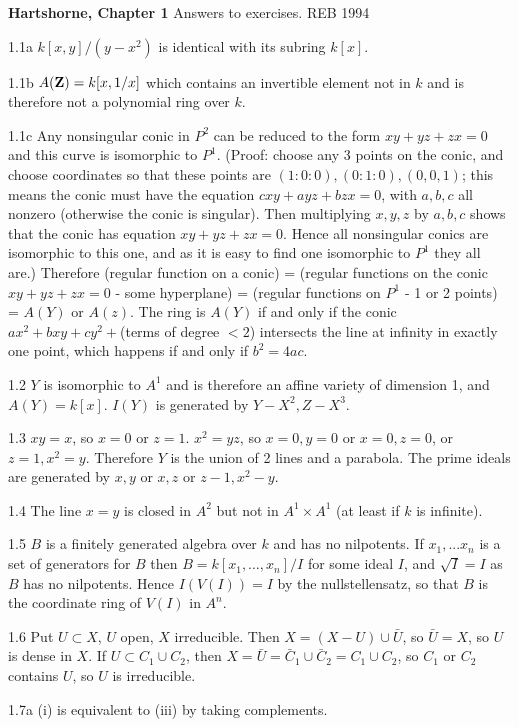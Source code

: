 \def\Z{{\bf Z}}
{\bf Hartshorne, Chapter 1}
Answers to exercises. \hfill REB 1994
\item{1.1a} $k[x,y]/(y-x^2)$ is identical with its subring $k[x]$. 
\item{1.1b} $A(\Z)=k[x,1/x]$ which contains an invertible element not
in $k$ and is therefore not a polynomial ring over $k$. 
\item{1.1c} Any nonsingular 
conic in $P^2$ can be reduced to the form $xy+yz+zx=0$
and this curve is isomorphic to $P^1$. (Proof: choose any 3 points
on the conic, and choose coordinates so that these points 
are $(1:0:0), (0:1:0), (0,0,1)$; this means the conic must
have the equation $cxy+ayz+bzx=0$, with $a,b,c$ all nonzero
(otherwise the conic is singular). Then multiplying
$x,y,z$ by $a,b,c$ shows that the conic has equation $xy+yz+zx=0$.
Hence all nonsingular conics are isomorphic to this one, 
and as it is easy to find one isomorphic to $P^1$ they all are.) 
Therefore (regular function on a conic) = (regular functions
on the conic $xy+yz+zx=0$ - some hyperplane) = 
(regular functions on $P^1$ - 1 or 2 points) = $A(Y)$ or $A(z)$. 
The ring is $A(Y)$ if and only if the conic $ax^2+bxy+cy^2+$(terms of degree
$< 2$)
intersects the line at infinity
in exactly one point, which happens if and only if $b^2=4ac$.  
\item{1.2} $Y$ is isomorphic to $A^1$ and is therefore an affine variety of
dimension 1, and $A(Y)=k[x]$. $I(Y) $ is generated by $Y-X^2,Z-X^3$. 
\item{1.3} $xy=x$, so $x=0$ or $z=1$. $x^2=yz$, so $x=0,y=0$ or
$x=0,z=0$, or $z=1,x^2=y$. Therefore $Y$ is the union of 2 lines
and a parabola. The prime ideals are generated by $x,y$ or $x,z$
or $z-1,x^2-y$. 
\item {1.4} The line $x=y$ is closed in $A^2$ but not in $A^1\times A^1$
(at least if $k$ is infinite).
\item{1.5} $B$ is a finitely generated algebra over $k$ and has no nilpotents.
If $x_1,...x_n$ is a set of generators for $B$ then $B=k[x_1,\ldots,x_n]/I$
for some ideal $I$, and $\sqrt I = I$ as $B$ has no nilpotents.
Hence $I(V(I))=I$ by the nullstellensatz, so that $B$ is the coordinate
ring of $V(I)$ in $A^n$. 
\item{1.6} Put $U\subset X$, $U$ open, $X$ irreducible.
Then $X=(X-U)\cup\bar U$, so $\bar U=X$, so $U$ is dense in $X$. 
If $U\subset C_1\cup C_2$, then $X=\bar U= \bar C_1\cup \bar C_2=
C_1\cup C_2$, so $C_1$ or $C_2$ contains $U$, so $U$ is irreducible.
\item {1.7a} (i) is equivalent to (iii) by taking complements. 
